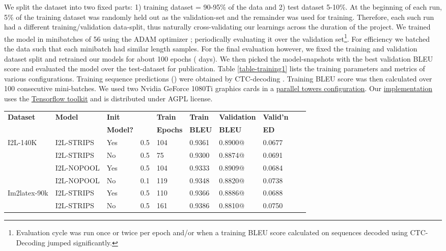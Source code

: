 \documentclass{article}
\newcommand{\implementation}{https://github.com/untrix/im2latex}
\begin{document}
We split the dataset into two fixed parts: 1) training dataset = 90-95\% of the data and 2) test dataset 5-10\%. At the beginning of each run, 5\% of the training dataset was randomly held out as the validation-set and the remainder was used for training. Therefore, each such run had a different training/validation data-split, thus naturally cross-validating our learnings across the duration of the project. We trained the model in minibatches of 56 using the ADAM optimizer \cite{Kingma2014AdamAM}; periodically evaluating it over the validation set\footnote{Evaluation cycle was run once or twice per epoch and/or when a training BLEU score calculated on sequences decoded using CTC-Decoding\cite{Graves2006ConnectionistTC} jumped significantly.}. For efficiency we batched the data such that each minibatch had similar length samples. For the final evaluation however, we fixed the training and validation dataset split and retrained our models for about 100 epochs ( days). We then picked the model-snapshots with the best validation BLEU score and evaluated the model over the test-dataset for publication. Table \ref{table-training1} lists the training parameters and metrics of various configurations. Training sequence predictions () were obtained by CTC-decoding  \cite{Graves2006ConnectionistTC} . Training BLEU score was then calculated over 100 consecutive mini-batches. We used two Nvidia GeForce 1080Ti graphics cards in a \href{https://github.com/petewarden/tensorflow_makefile/blob/master/tensorflow/models/image/cifar10/cifar10_multi_gpu_train.py}{parallel towers configuration}. Our \href{\implementation}{implementation} uses the \href{https://www.tensorflow.org/}{Tensorflow toolkit} and is distributed under AGPL license. 
\begin{table*}[!hbtp]
	\caption{Training metrics.  for all runs. The number after @ sign is the training epoch of the selected model-snapshot.  denotes that the row corresponds to Table \ref{table-scores}.}
	\begin{tabular}{lll|lll|llll}
		\hline
		\textbf{Dataset} & \textbf{Model} & \textbf{Init}  &\textbf{}  & \textbf{Train}  & \textbf{Train} & \textbf{Validation}  & \textbf{Valid'n}\\&                & \textbf{Model?}&                    & \textbf{Epochs} & \textbf{BLEU}  & \textbf{BLEU}        & \textbf{ED}        \\\hline 
		I2L-140K    & I2L-STRIPS & Yes & 0.5 & 104 & 0.9361 & 0.8900@ & 0.0677 \\& I2L-STRIPS & No  & 0.5 & 75  & 0.9300 & 0.8874@   & 0.0691 \\& I2L-NOPOOL & Yes & 0.5 & 104 & 0.9333 & 0.8909@ & 0.0684 \\& I2L-NOPOOL & No  & 0.1 & 119 & 0.9348 & 0.8820@   & 0.0738 \\\hline
		Im2latex-90k& I2L-STRIPS & Yes & 0.5 & 110 & 0.9366 & 0.8886@ & 0.0688 \\& I2L-STRIPS & No  & 0.5 & 161 & 0.9386 & 0.8810@  & 0.0750 \\\hline
	\end{tabular}
	\centering
	\label{table-training1}
\end{table*}
\end{document}
